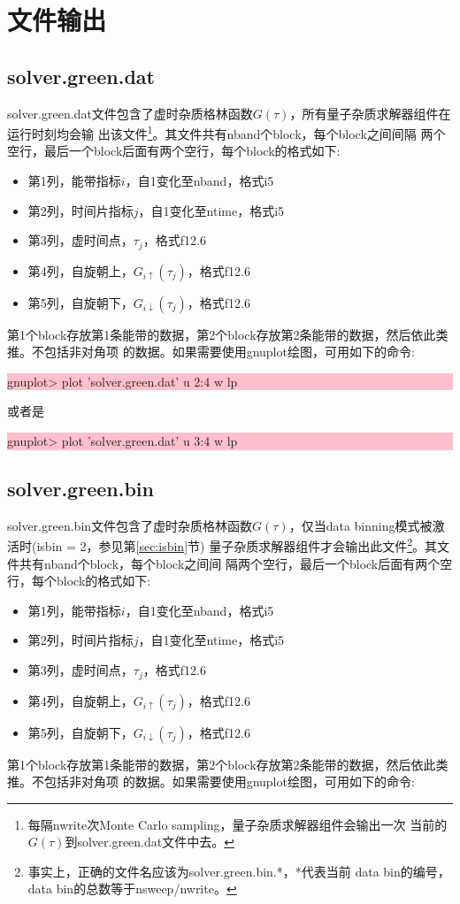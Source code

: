 \section{文件输出}
\label{sec:file}

\subsection{solver.green.dat}
solver.green.dat文件包含了虚时杂质格林函数$G(\tau)$，所有量子杂质求解器组件在运行时刻均会输
出该文件\footnote{每隔nwrite次Monte Carlo sampling，量子杂质求解器组件会输出一次
当前的$G(\tau)$到solver.green.dat文件中去。}。其文件共有nband个block，每个block之间间隔
两个空行，最后一个block后面有两个空行，每个block的格式如下:
\begin{itemize}
\item 第1列，能带指标$i$，自1变化至nband，格式i5
\item 第2列，时间片指标$j$，自1变化至ntime，格式i5
\item 第3列，虚时间点，$\tau_{j}$，格式f12.6
\item 第4列，自旋朝上，$G_{i\uparrow}(\tau_{j})$，格式f12.6
\item 第5列，自旋朝下，$G_{i\downarrow}(\tau_{j})$，格式f12.6
\end{itemize}
第1个block存放第1条能带的数据，第2个block存放第2条能带的数据，然后依此类推。不包括非对角项
的数据。如果需要使用gnuplot绘图，可用如下的命令:

\noindent\colorbox{pink}{\parbox[r]{\linewidth}{\quad gnuplot> plot 'solver.green.dat' u 2:4 w lp }}

或者是

\noindent\colorbox{pink}{\parbox[r]{\linewidth}{\quad gnuplot> plot 'solver.green.dat' u 3:4 w lp }}

\subsection{solver.green.bin}
solver.green.bin文件包含了虚时杂质格林函数$G(\tau)$，仅当data binning模式被激活时(isbin = 2，参见第\ref{sec:isbin}节)
量子杂质求解器组件才会输出此文件\footnote{事实上，正确的文件名应该为solver.green.bin.*，*代表当前
data bin的编号，data bin的总数等于nsweep/nwrite。}。其文件共有nband个block，每个block之间间
隔两个空行，最后一个block后面有两个空行，每个block的格式如下:
\begin{itemize}
\item 第1列，能带指标$i$，自1变化至nband，格式i5
\item 第2列，时间片指标$j$，自1变化至ntime，格式i5
\item 第3列，虚时间点，$\tau_{j}$，格式f12.6
\item 第4列，自旋朝上，$G_{i\uparrow}(\tau_{j})$，格式f12.6
\item 第5列，自旋朝下，$G_{i\downarrow}(\tau_{j})$，格式f12.6
\end{itemize}
第1个block存放第1条能带的数据，第2个block存放第2条能带的数据，然后依此类推。不包括非对角项
的数据。如果需要使用gnuplot绘图，可用如下的命令:

